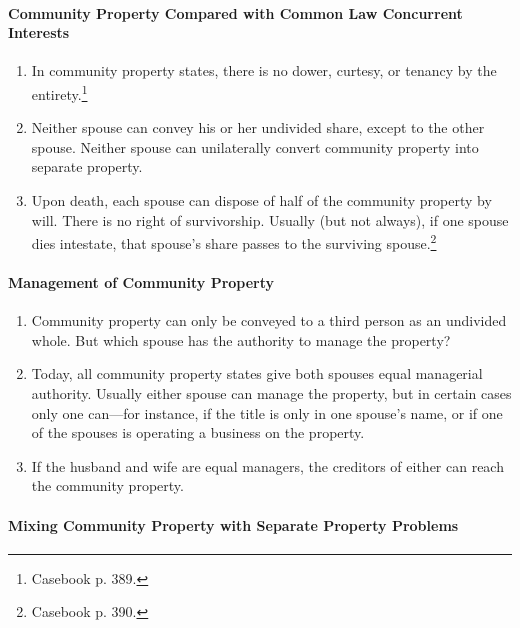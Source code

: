 \paragraph{Community Property Compared with Common Law Concurrent Interests}

\begin{enumerate}
    \item In community property states, there is no dower, curtesy, or tenancy 
    by the entirety.\footnote{Casebook p. 389.}
    \item Neither spouse can convey his or her undivided share, except to the 
    other spouse. Neither spouse can unilaterally convert community property 
    into separate property.
    \item Upon death, each spouse can dispose of half of the community 
    property by will. There is no right of survivorship. Usually (but not 
    always), if one spouse dies intestate, that spouse's share passes to the 
    surviving spouse.\footnote{Casebook p. 390.}
\end{enumerate}

\paragraph{Management of Community Property}

\begin{enumerate}
    \item Community property can only be conveyed to a third person as an 
    undivided whole. But which spouse has the authority to manage the 
    property?
    \item Today, all community property states give both spouses equal 
    managerial authority. Usually either spouse can manage the property, but 
    in certain cases only one can---for instance, if the title is only in one 
    spouse's name, or if one of the spouses is operating a business on the 
    property.
    \item If the husband and wife are equal managers, the creditors of either 
    can reach the community property.
\end{enumerate}

\paragraph{Mixing Community Property with Separate Property Problems}

